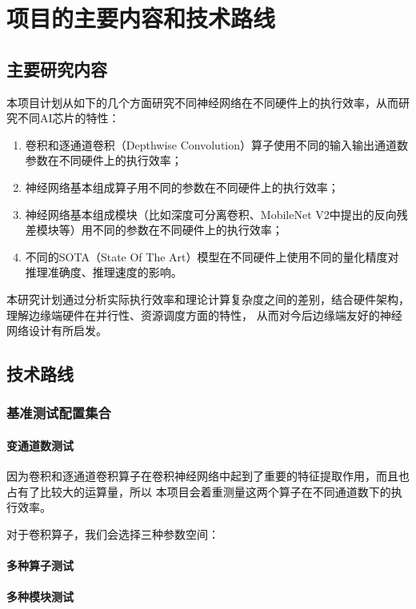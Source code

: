 \section{项目的主要内容和技术路线}

\subsection{主要研究内容}
本项目计划从如下的几个方面研究不同神经网络在不同硬件上的执行效率，从而研究不同AI芯片的特性：
\begin{enumerate}
    \item 卷积和逐通道卷积（Depthwise Convolution）算子使用不同的输入输出通道数参数在不同硬件上的执行效率；
    \item 神经网络基本组成算子用不同的参数在不同硬件上的执行效率；
    \item 神经网络基本组成模块（比如深度可分离卷积、MobileNet V2中提出的反向残差模块等）用不同的参数在不同硬件上的执行效率；
    \item 不同的SOTA（State Of The Art）模型在不同硬件上使用不同的量化精度对推理准确度、推理速度的影响。
\end{enumerate}

本研究计划通过分析实际执行效率和理论计算复杂度之间的差别，结合硬件架构，理解边缘端硬件在并行性、资源调度方面的特性，
从而对今后边缘端友好的神经网络设计有所启发。

\subsection{技术路线}

\subsubsection{基准测试配置集合}

\paragraph{变通道数测试}
因为卷积和逐通道卷积算子在卷积神经网络中起到了重要的特征提取作用，而且也占有了比较大的运算量，所以
本项目会着重测量这两个算子在不同通道数下的执行效率。

对于卷积算子，我们会选择三种参数空间：%

\paragraph{多种算子测试}

\paragraph{多种模块测试}

